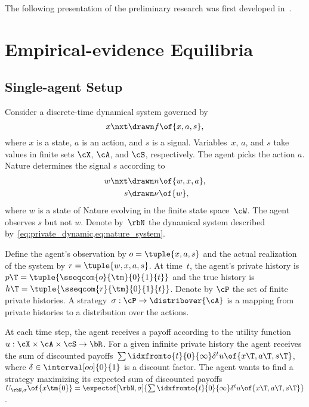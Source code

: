 The following presentation of the preliminary research was first developed in~\cite{dudebout_shamma:2012}.

\section{Empirical-evidence Equilibria}
\label{sec:empirical_evidence_equilibria}

\subsection{Single-agent Setup}

Consider a discrete-time dynamical system governed by
\begin{equation}
\label{eq:private_dynamic}
x\nxt \drawn  f \of{x, a, s},
\end{equation}
where \(x\) is a state, \(a\) is an action, and \(s\) is a signal.
Variables~\(x\), \(a\), and \(s\) take values in finite sets \(\cX\), \(\cA\), and \(\cS\), respectively.
The agent picks the action \(a\).
Nature determines the signal \(s\) according to
\begin{subequations}
\label{eq:nature_system}
\begin{align}
\label{eq:nature_dynamic}
w\nxt &\drawn n \of{w, x, a}, \\
\label{eq:nature_signal}
s &\drawn \nu \of{w},
\end{align}
\end{subequations}
where \(w\) is a state of Nature evolving in the finite state space~\(\cW\).
The agent observes \(s\) but not \(w\).
Denote by~\(\rbN\) the dynamical system described by~\cref{eq:private_dynamic,eq:nature_system}.

Define the agent's observation by \(o = \tuple{x, a, s}\) and the actual realization of the system by \(r = \tuple{w, x, a, s}\).
At time~\(t\), the agent's private history is \(p\T = \tuple{\sseqcom{o}{\tm}{0}{1}{t}}\) and the true history is \(h\T = \tuple{\sseqcom{r}{\tm}{0}{1}{t}}\).
Denote by \(\cP\) the set of finite private histories.
A strategy~\(\sigma : \cP \to \distribover{\cA}\) is a mapping from private histories to a distribution over the actions.

At each time step, the agent receives a payoff according to the utility function \(u: \cX \times \cA \times \cS \to \bR\).
For a given infinite private history the agent receives the sum of discounted payoffs~\(\sum\idxfromto{t}{0}{\infty} \delta^t u \of{x\T, a\T, s\T}\), where \(\delta \in \interval[oo]{0}{1}\) is a discount factor.
The agent wants to find a strategy maximizing its expected sum of discounted payoffs \(U\params{\rbN, \sigma}\of{x\tm{0}} = \expectof[\rbN, \sigma]{\sum\idxfromto{t}{0}{\infty} \delta^t u \of{x\T, a\T, s\T}}\).

